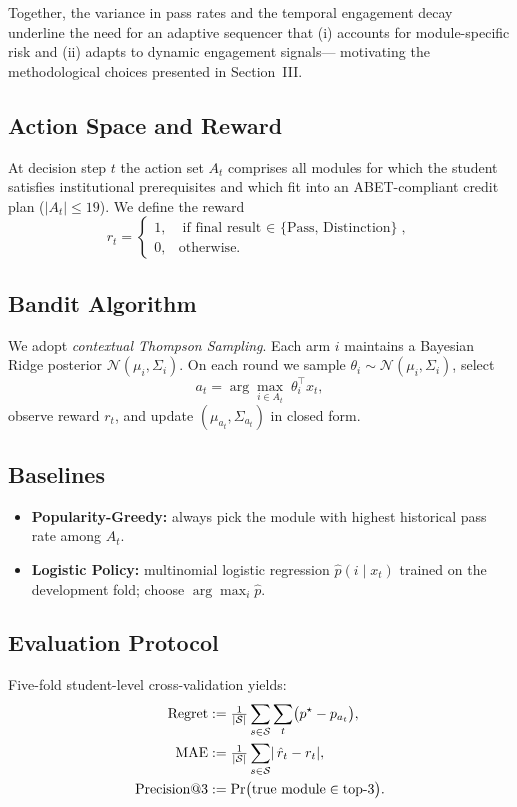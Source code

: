\documentclass[conference]{IEEEtran}
\begin{document}
Together, the variance in pass rates and the temporal engagement decay
underline the need for an adaptive sequencer that (i) accounts for
module-specific risk and (ii) adapts to dynamic engagement signals—
motivating the methodological choices presented in Section~III.

\subsection{Action Space and Reward}
At decision step $t$ the action set $A_t$ comprises all modules for which the student satisfies institutional prerequisites and which fit into an ABET-compliant credit plan ($|A_t|\!\le\!19$).  
We define the reward  
\[
  r_t =
    \begin{cases}
      1, & \text{if final result $\in$ \{Pass, Distinction\}},\\
      0, & \text{otherwise.}
    \end{cases}
\]

\subsection{Bandit Algorithm}
We adopt \emph{contextual Thompson Sampling}.  
Each arm $i$ maintains a Bayesian Ridge posterior $\mathcal{N}(\mu_i,\Sigma_i)$.  
On each round we sample $\theta_i\!\sim\!\mathcal{N}(\mu_i,\Sigma_i)$, select
\[
  a_t = \arg\!\max_{i\in A_t}\;\theta_i^\top x_t,
\]
observe reward $r_t$, and update $(\mu_{a_t},\Sigma_{a_t})$ in closed form.

\subsection{Baselines}
\begin{itemize}
  \item \textbf{Popularity-Greedy:} always pick the module with highest historical pass rate among $A_t$.
  \item \textbf{Logistic Policy:} multinomial logistic regression $\hat p(i\mid x_t)$ trained on the development fold; choose $\arg\max_i\hat p$.
\end{itemize}

\subsection{Evaluation Protocol}
Five-fold student-level cross-validation yields:
\begin{align*}
\text{Regret} &:= \tfrac1{|{\cal S}|}\sum_{s\in{\cal S}}\sum_t\bigl(p^\star - p_{a_t}\bigr),\\
\text{MAE}      &:= \tfrac1{|{\cal S}|}\sum_{s\in{\cal S}}\!|\,\hat r_t-r_t|,\\
\text{Precision@3} &:= \Pr\bigl(\text{true module} \in \text{top-3}\bigr).
\end{align*}
\end{document}
